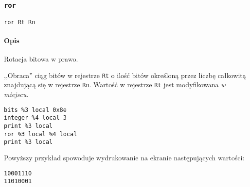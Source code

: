 \subsubsection{\texttt{ror}}

\begin{lstlisting}
ror Rt Rn
\end{lstlisting}

\paragraph*{Opis} Rotacja bitowa w prawo.

,,Obraca'' ciąg bitów w rejestrze \texttt{Rt} o ilość bitów określoną przez
liczbę całkowitą znajdującą się w rejestrze \texttt{Rn}. Wartość w rejestrze
\texttt{Rt} jest modyfikowana \emph{w miejscu}.
\begin{lstlisting}
bits %3 local 0x8e
integer %4 local 3
print %3 local
ror %3 local %4 local
print %3 local
\end{lstlisting}

Powyższy przykład spowoduje wydrukowanie na ekranie następujących wartości:
\begin{lstlisting}
10001110
11010001
\end{lstlisting}
